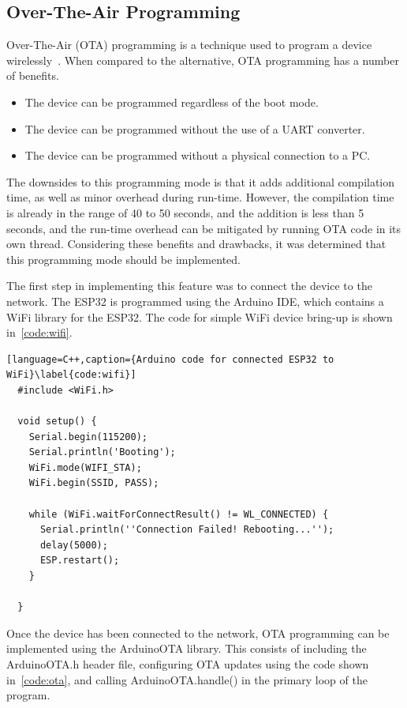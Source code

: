 \subsection{Over-The-Air Programming}
Over-The-Air (OTA) programming is a technique used to program a device wirelessly~\cite{Quadri:2014}.
When compared to the alternative, OTA programming has a number of benefits.

\begin{itemize}
        \item The device can be programmed regardless of the boot mode.
        \item The device can be programmed without the use of a UART converter.
        \item The device can be programmed without a physical connection to a PC.
\end{itemize}

The downsides to this programming mode is that it adds additional compilation time, as well as minor overhead during run-time.
However, the compilation time is already in the range of 40 to 50 seconds, and the addition is less than 5 seconds,
and the run-time overhead can be mitigated by running OTA code in its own thread.
Considering these benefits and drawbacks, it was determined that this programming mode should be implemented.

The first step in implementing this feature was to connect the device to the network.
The ESP32 is programmed using the Arduino IDE, which contains a WiFi library for the ESP32.
The code for simple WiFi device bring-up is shown in~\autoref{code:wifi}.

\begin{lstlisting}[language=C++,caption={Arduino code for connected ESP32 to WiFi}\label{code:wifi}]
  #include <WiFi.h>

  void setup() {
    Serial.begin(115200);
    Serial.println('Booting');
    WiFi.mode(WIFI_STA);
    WiFi.begin(SSID, PASS);

    while (WiFi.waitForConnectResult() != WL_CONNECTED) {
      Serial.println(''Connection Failed! Rebooting...'');
      delay(5000);
      ESP.restart();
    }

  }
\end{lstlisting}

Once the device has been connected to the network, OTA programming can be implemented using the ArduinoOTA library.
This consists of including the ArduinoOTA.h header file,
configuring OTA updates using the code shown in~\autoref{code:ota},
and calling ArduinoOTA.handle() in the primary loop of the program.

